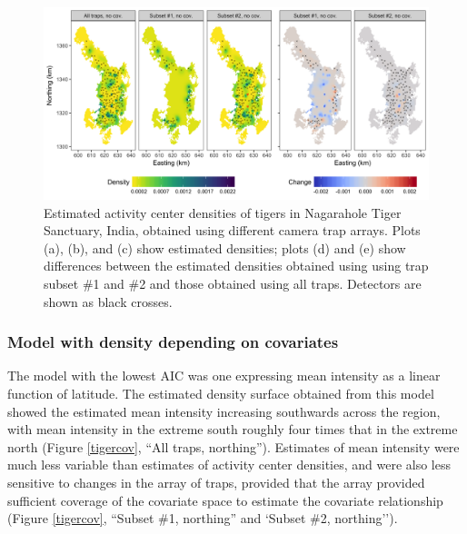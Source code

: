 \documentclass[a4paper,12pt]{article}
\begin{document}
\begin{figure}[htbp]
\centering
\includegraphics[width=1\textwidth]{tiger_surfaces_nocovs}
\caption{Estimated activity center densities of tigers in Nagarahole Tiger Sanctuary, India, obtained using different camera trap arrays. Plots (a), (b), and (c) show estimated densities; plots (d) and (e) show differences between the estimated densities obtained using using trap subset \#1 and \#2 and those obtained using all traps. Detectors are shown as black crosses.}
\label{tigernocov}
\end{figure}

\subsubsection{Model with density depending on covariates}

The model with the lowest AIC was one expressing mean intensity as a linear function of latitude. The estimated density surface obtained from this model showed the estimated mean intensity increasing southwards across the region, with mean intensity in the extreme south roughly four times that in the extreme north (Figure \ref{tigercov}, ``All traps, northing''). Estimates of mean intensity were much less variable than estimates of activity center densities, and were also less sensitive to changes in the array of traps, provided that the array provided sufficient coverage of the covariate space to estimate the covariate relationship (Figure \ref{tigercov}, ``Subset \#1, northing'' and `Subset \#2, northing''). 
\end{document}
